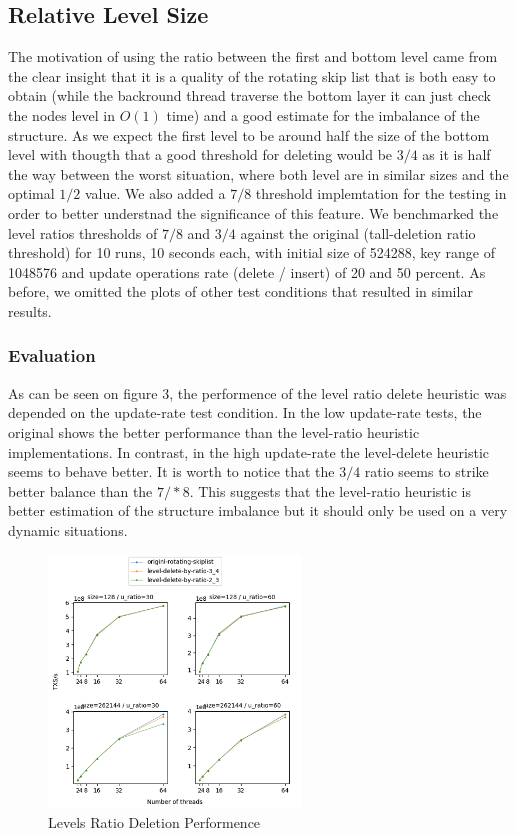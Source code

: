 \documentclass{article}
\begin{document}
\subsection{Relative Level Size}
\label{ssec:rls}

The motivation of using the ratio between the first and bottom level came from the clear insight that it is a quality of the rotating skip list that is both easy to obtain (while the backround thread traverse the bottom layer it can just check the nodes level in $O(1)$ time) and a good estimate for the imbalance of the structure. As we expect the first level to be around half the size of the bottom level with thougth that a good threshold for deleting would be $3/4$ as it is half the way between the worst situation, where both level are in similar sizes and the optimal $1/2$ value. We also added a $7/8$ threshold implemtation for the testing in order to better understnad the significance of this feature. We benchmarked the level ratios thresholds of $7/8$ and $3/4$ against the original (tall-deletion ratio threshold) for 10 runs, 10 seconds each, with initial size of 524288, key range of 1048576 and update operations rate (delete / insert) of 20 and 50 percent. As before, we omitted the plots of other test conditions that resulted in similar results. 

\subsubsection{Evaluation}
\label{sssec:rls-evl}

As can be seen on figure 3, the performence of the level ratio delete heuristic was depended on the update-rate test condition. In the low update-rate tests, the original shows the better performance than the level-ratio heuristic implementations. In contrast, in the high update-rate the level-delete heuristic seems to behave better. It is worth to notice that the $3/4$ ratio seems to strike better balance than the $7/*8$. This suggests that the level-ratio heuristic is better estimation of the structure imbalance but it should only be used on a very dynamic situations.

\begin{figure}
	\caption{Levels Ratio Deletion Performence}
	\centering
	\includegraphics[width=0.6\textwidth]{level-delete-by-ratio_plot}
\end{figure}
\end{document}

